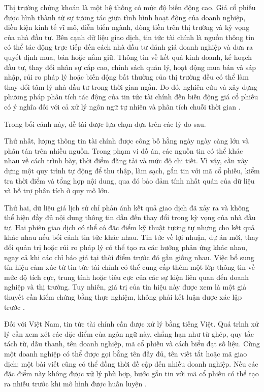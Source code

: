 \documentclass[12pt, a4paper, oneside]{report}
\begin{document}
Thị trường chứng khoán là một hệ thống có mức độ biến động cao. Giá cổ phiếu được hình
thành từ sự tương tác giữa tình hình hoạt động của doanh nghiệp, điều kiện kinh tế vĩ
mô, diễn biến ngành, dòng tiền trên thị trường và kỳ vọng của nhà đầu tư. Bên cạnh dữ
liệu giao dịch, tin tức tài chính là nguồn thông tin có thể tác động trực tiếp đến cách
nhà đầu tư đánh giá doanh nghiệp và đưa ra quyết định mua, bán hoặc nắm giữ. Thông tin
về kết quả kinh doanh, kế hoạch đầu tư, thay đổi nhân sự cấp cao, chính sách quản lý,
hoạt động mua bán và sáp nhập, rủi ro pháp lý hoặc biến động bất thường của thị trường
đều có thể làm thay đổi tâm lý nhà đầu tư trong thời gian ngắn. Do đó, nghiên cứu và
xây dựng phương pháp phân tích tác động của tin tức tài chính đến biến động giá cổ
phiếu có ý nghĩa đối với cả xử lý ngôn ngữ tự nhiên và phân tích chuỗi thời gian
\cite{Chen2019_191005078v1,Chen2021_210708721v1}.


Trong bối cảnh này, đề tài được lựa chọn dựa trên các lý do sau.

Thứ nhất, lượng thông tin tài chính được công bố hằng ngày ngày càng lớn và phân tán
trên nhiều nguồn. Trong phạm vi đồ án, các nguồn tin có thể khác nhau về cách trình
bày, thời điểm đăng tải và mức độ chi tiết. Vì vậy, cần xây dựng một quy trình tự động
để thu thập, làm sạch, gắn tin với mã cổ phiếu, kiểm tra thời điểm và tổng hợp nội dung,
qua đó bảo đảm tính nhất quán của dữ liệu và hỗ trợ phân tích ở quy mô lớn.


Thứ hai, dữ liệu giá lịch sử chỉ phản ánh kết quả giao dịch đã xảy ra và không thể hiện
đầy đủ nội dung thông tin dẫn đến thay đổi trong kỳ vọng của nhà đầu tư. Hai phiên giao
dịch có thể có đặc điểm kỹ thuật tương tự nhưng cho kết quả khác nhau nếu bối cảnh tin
tức khác nhau. Tin tức về lợi nhuận, dự án mới, thay đổi quản trị hoặc rủi ro pháp lý
có thể tạo ra các hướng phản ứng khác nhau, ngay cả khi các chỉ báo giá tại thời điểm
trước đó gần giống nhau. Việc bổ sung tín hiệu cảm xúc từ tin tức tài chính có thể cung
cấp thêm một lớp thông tin về mức độ tích cực, trung tính hoặc tiêu cực của các sự kiện
liên quan đến doanh nghiệp và thị trường. Tuy nhiên, giá trị của tín hiệu này được xem
là một giả thuyết cần kiểm chứng bằng thực nghiệm, không phải kết luận được xác lập
trước \cite{Jiang2023_230602136v3,Siala2026_260200086v3}.

Đối với Việt Nam, tin tức tài chính cần được xử lý bằng tiếng Việt. Quá trình xử lý
cần xem xét các đặc điểm của ngôn ngữ này, chẳng hạn như từ ghép, quy tắc tách từ, dấu
thanh, tên doanh nghiệp, mã cổ phiếu và cách biểu đạt số liệu. Cùng một doanh nghiệp
có thể được gọi bằng tên đầy đủ, tên viết tắt hoặc mã giao dịch; một bài viết cũng có
thể đồng thời đề cập đến nhiều doanh nghiệp. Nếu các đặc điểm này không được xử lý phù
hợp, bước gắn tin với mã cổ phiếu có thể tạo ra nhiễu trước khi mô hình được huấn luyện
\cite{Nguyen2020_200300744v3}.
\end{document}
